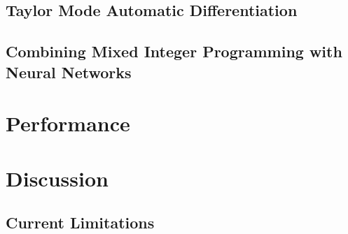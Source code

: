 \subsection{Taylor Mode Automatic Differentiation}
\label{subsec:taylor_mode_automatic_differentiation}

\subsection{Combining Mixed Integer Programming with Neural Networks}
\label{subsec:combining_mixed_integer_programming_with_neural_networks}



\section{Performance}
\label{sec:performance_lux}


\section{Discussion}
\label{sec:discussion_lux}

\subsection{Current Limitations}
\label{subsec:current_limitations}

